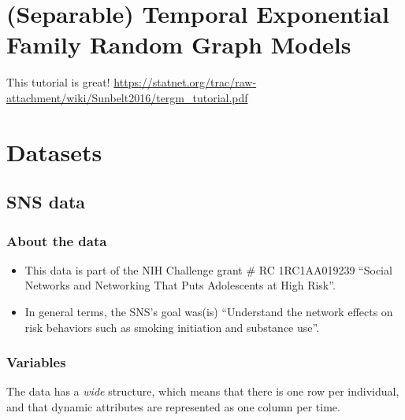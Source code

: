 \documentclass[]{book}
\theoremstyle{definition}
\theoremstyle{definition}
\theoremstyle{definition}
\theoremstyle{remark}
\begin{document}
\chapter{(Separable) Temporal Exponential Family Random Graph
Models}\label{separable-temporal-exponential-family-random-graph-models}

This tutorial is great!
\url{https://statnet.org/trac/raw-attachment/wiki/Sunbelt2016/tergm_tutorial.pdf}

\cleardoublepage 

\appendix


\chapter{Datasets}\label{datasets}

\hypertarget{sns-data}{\section{SNS data}\label{sns-data}}

\subsection{About the data}\label{about-the-data}

\begin{itemize}
\item
  This data is part of the NIH Challenge grant \# RC 1RC1AA019239
  ``Social Networks and Networking That Puts Adolescents at High Risk''.
\item
  In general terms, the SNS's goal was(is) ``Understand the network
  effects on risk behaviors such as smoking initiation and substance
  use''.
\end{itemize}

\subsection{Variables}\label{variables}

The data has a \emph{wide} structure, which means that there is one row
per individual, and that dynamic attributes are represented as one
column per time.
\end{document}
